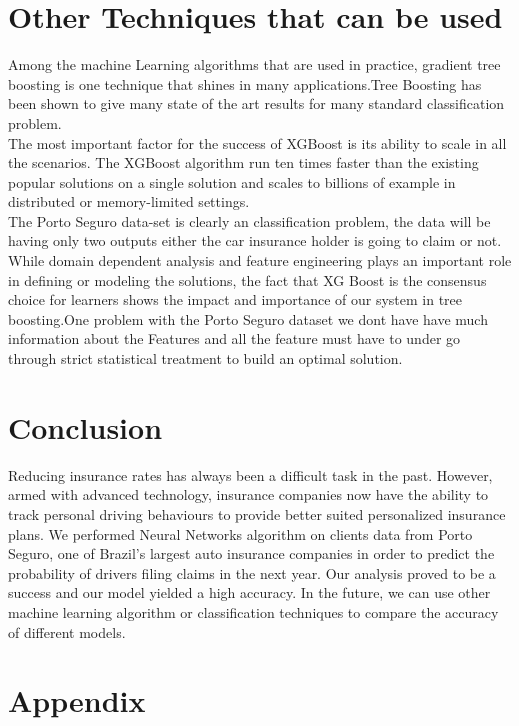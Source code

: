 \section{Other Techniques that can be used}

Among the machine Learning algorithms that are used in practice, gradient tree boosting is one technique that shines in many applications.Tree Boosting has been shown to give many state of the art results for many standard classification problem.
\\
The most important factor for the success of XGBoost is its ability to scale in all the scenarios. The XGBoost algorithm run ten times faster than the existing popular solutions on a single solution and scales to billions of example in distributed or memory-limited settings.
\\
The Porto Seguro data-set is clearly an classification problem, the data will be having only two outputs either the car insurance holder is going to claim or not.
\\
While domain dependent analysis and feature engineering plays an important role in defining or modeling the solutions, the fact that XG Boost is the consensus choice for learners shows the impact and importance  of our system in tree boosting.One problem with the Porto Seguro dataset we dont have have much information about the Features and all the feature must have to under go through strict statistical treatment to build an optimal solution.

\section{Conclusion}

Reducing insurance rates has always been a difficult task in the past. However, armed with advanced technology, insurance companies now have the ability to track personal driving behaviours to provide better suited personalized insurance plans. We performed Neural Networks algorithm on clients data from Porto Seguro, one of Brazil's largest auto insurance companies in order to predict the probability of drivers filing claims in the next year. Our analysis proved to be a success and our model yielded a high accuracy. In the future, we can use other machine learning algorithm or classification techniques to compare the accuracy of different models. 


\section{Appendix}
